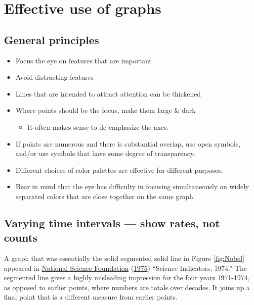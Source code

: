 \documentclass[
  10pt,
  b5paper]{book}
\providecommand{\tightlist}{%
  \setlength{\itemsep}{0pt}\setlength{\parskip}{0pt}}
\begin{document}
\hypertarget{effective-use-of-graphs}{%
\chapter{Effective use of graphs}\label{effective-use-of-graphs}}

\hypertarget{general-principles}{%
\section{General principles}\label{general-principles}}

\begin{itemize}
\tightlist
\item
  Focus the eye on features that are important
\item
  Avoid distracting features
\item
  Lines that are intended to attract attention can be
  thickened
\item
  Where points should be the focus, make them large \& dark

  \begin{itemize}
  \tightlist
  \item
    It often makes sense to de-emphasize the axes.
  \end{itemize}
\item
  If points are numerous and there is substantial overlap,
  use open symbols, and/or use symbols that have some
  degree of transparency.
\item
  Different choices of color palettes are effective for different purposes.
\item
  Bear in mind that the eye has difficulty in focusing
  simultaneously on widely separated colors that are close
  together on the same graph.
\end{itemize}

\hypertarget{varying-time-intervals-show-rates-not-counts}{%
\section{Varying time intervals --- show rates, not counts}\label{varying-time-intervals-show-rates-not-counts}}

A graph that was essentially the solid segmented solid line in
Figure \ref{fig:Nobel} appeared in \protect\hyperlink{ref-national1975science}{National Science Foundation} (\protect\hyperlink{ref-national1975science}{1975})
``Science Indicators, 1974.'' The segmented line gives
a highly misleading impression for the four years 1971-1974, as
opposed to earlier points, where numbers are totals over decades.
It joins up a final point that is a different measure from earlier
points.
\end{document}
